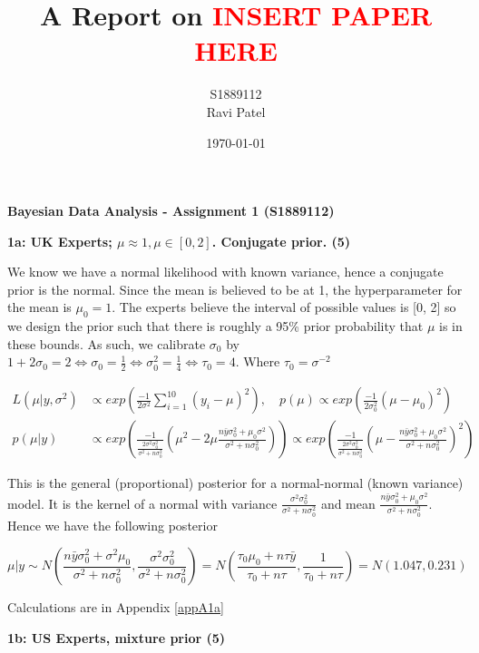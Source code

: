 \documentclass{article}
\title{A Report on \textcolor{red}{INSERT PAPER HERE}}
\author{S1889112 \\ Ravi Patel}
\date{\today}
\begin{document}
\setlength{\abovedisplayskip}{0pt}
\setlength{\belowdisplayskip}{0pt}
\setlength{\abovedisplayshortskip}{0pt}
\setlength{\belowdisplayshortskip}{0pt}


\textbf{Bayesian Data Analysis - Assignment 1 (S1889112)}

\textbf{1a: UK Experts; $\mu\approx1, \mu \in [0,2]$. Conjugate prior. (5)} \label{sec:1a}

We know we have a normal likelihood with known variance, hence a conjugate prior is the normal. Since the mean is believed to be at 1, the hyperparameter for the mean is $\mu_0 = 1$. The experts believe the interval of possible values is [0, 2] so we design the prior such that there is roughly a 95\% prior probability that $\mu$ is in these bounds. As such, we calibrate $\sigma_0$ by $1 + 2\sigma_0 = 2 \iff \sigma_0 = \frac{1}{2} \iff \sigma_0^2 = \frac{1}{4} \iff \tau_0 = 4$. Where $\tau_0 = \sigma^{-2}$

\begin{align}
L(\mu|y, \sigma^2) &\propto exp\left(\frac{-1}{2\sigma^2} \sum_{i=1}^{10} (y_i - \mu)^2\right), \quad p(\mu) \propto exp\left(\frac{-1}{2\sigma^2_0}(\mu - \mu_0)^2\right) \\
p(\mu|y) &\propto exp\left(\frac{-1}{\frac{2\sigma^2\sigma^2_0}{\sigma^2 + n\sigma^2_0}}\left(\mu^2 - 2\mu \frac{n\bar{y}\sigma^2_0 + \mu_0\sigma^2}{\sigma^2+n\sigma^2_0}\right)\right) \propto exp\left(\frac{-1}{\frac{2\sigma^2\sigma^2_0}{\sigma^2 + n\sigma^2_0}}\left(\mu - \frac{n\bar{y}\sigma^2_0 + \mu_0\sigma^2}{\sigma^2+n\sigma^2_0}\right)^2\right) \label{eq3}
\end{align}

This is the general (proportional) posterior for a normal-normal (known variance) model. It is the kernel of a normal with variance $\frac{\sigma^2\sigma^2_0}{\sigma^2 + n\sigma^2_0}$ and mean $\frac{n\bar{y}\sigma^2_0 + \mu_0 \sigma^2}{\sigma^2 + n\sigma^2_0}$. Hence we have the following posterior

\begin{equation}
\mu|y \sim N\left(\frac{n\bar{y}\sigma^2_0 + \sigma^2\mu_0}{\sigma^2 + n\sigma^2_0}, \frac{\sigma^2\sigma^2_0}{\sigma^2 + n\sigma^2_0}\right) = N\left(\frac{\tau_0\mu_0 + n\tau\bar{y}}{\tau_0 + n\tau}, \frac{1}{\tau_0 + n\tau}\right) = N(1.047, 0.231)
\end{equation}

Calculations are in Appendix \ref{appA1a}

\textbf{1b: US Experts, mixture prior (5)} \label{sec:1b}
\end{document}
